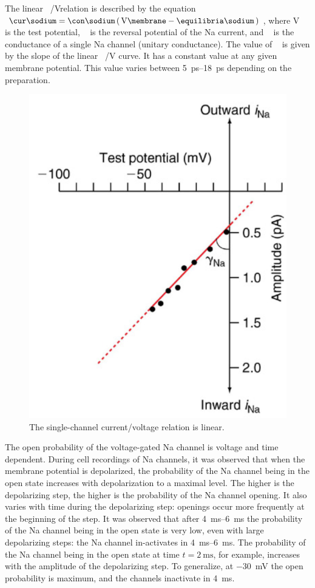 \documentclass[../../Orator]{subfiles}
\begin{document}
The linear \unit[per-mode = symbol]{\cur\sodium\per\V}relation is described by the equation \(\unit{\cur\sodium} = \unit{\con\sodium} \br{\unit{\V\membrane}-\unit{\equilibria\sodium}}\), where \unit{\V\membrane} is the test potential, \unit{\equilibria\sodium} is the reversal potential of the \gls{Na} current, and \unit{\con\sodium} is the conductance of a single \gls{Na} channel (unitary conductance). The value of \unit{\con\sodium} is given by the slope of the linear \unit[per-mode = symbol]{\cur\sodium\per\V} curve. It has a constant value at any given membrane potential. This value varies between \qtyrange{5}{18}{\pico\second} depending on the preparation.

\begin{figure}[H]
    \centering
    \includegraphics[width=0.5\linewidth]{Pictures//Anakin/iNa-VNa.png}
    \caption{The single-channel current/voltage \br{\unit[per-mode = symbol]{\cur\sodium\per\volt}} relation is linear. }
    \label{fig:enter-label}
\end{figure}
The open probability of the voltage-gated \gls{Na} channel is voltage and time dependent. During cell recordings of \gls{Na} channels, it was observed that when the membrane potential is depolarized, the probability of the \gls{Na} channel being in the open state increases with depolarization to a maximal level. The higher is the depolarizing step, the higher is the probability of the \gls{Na} channel opening. It also varies with time during the depolarizing step: openings occur more frequently at the beginning of the step. It was observed  that after \qtyrange{4}{6}{\ms} the probability of the \gls{Na} channel being in the open state is very low, even with large depolarizing steps: the \gls{Na} channel in-activates in \qtyrange{4}{6}{\ms}.  The probability of the \gls{Na} channel being in the open state at time \(t=\qty{2}{\ms}\), for example, increases with the amplitude of the depolarizing step. To generalize, at \qty{-30}{\mV} the open probability is maximum, and the channels inactivate in \qty{4}{\ms}. 
\end{document}
